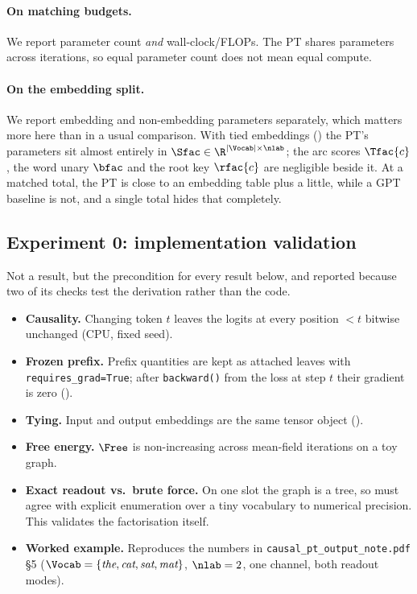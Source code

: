\paragraph{On matching budgets.}
We report parameter count \emph{and} wall-clock/FLOPs. The PT shares parameters across
iterations, so equal parameter count does not mean equal compute.

\paragraph{On the embedding split.}
We report embedding and non-embedding parameters separately, which matters more here than in a
usual comparison. With tied embeddings () the PT's parameters sit almost
entirely in $\Sfac \in \R^{|\Vocab| \times \nlab}$; the arc scores $\Tfac{c}$, the word unary
$\bfac$ and the root key $\rfac{c}$ are negligible beside it. At a matched total, the PT is
close to an embedding table plus a little, while a GPT baseline is not, and a single total
hides that completely. 

\subsection{Experiment 0: implementation validation}
\label{sec:exp0}

Not a result, but the precondition for every result below, and reported because two of its
checks test the derivation rather than the code.

\begin{itemize}
  \item \textbf{Causality.} Changing token $t$ leaves the logits at every position $<t$
        bitwise unchanged (CPU, fixed seed).
  \item \textbf{Frozen prefix.} Prefix quantities are kept as attached leaves with
        \texttt{requires\_grad=True}; after \texttt{backward()} from the loss at step $t$ their
        gradient is zero ().
  \item \textbf{Tying.} Input and output embeddings are the same tensor object
        ().
  \item \textbf{Free energy.} $\Free$ is non-increasing across mean-field iterations on a toy
        graph. 
  \item \textbf{Exact readout vs.\ brute force.} On one slot the graph is a tree, so
         must agree with explicit enumeration over a tiny vocabulary to
        numerical precision. This validates the factorisation itself.
  \item \textbf{Worked example.} Reproduces the numbers in \texttt{causal\_pt\_output\_note.pdf}
        \S5 ($\Vocab = \{\textit{the}, \textit{cat}, \textit{sat}, \textit{mat}\}$, $\nlab=2$,
        one channel, both readout modes).
\end{itemize}

